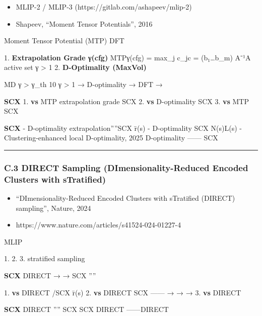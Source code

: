\documentclass[
  12pt,
]{article}
\providecommand{\tightlist}{%
  \setlength{\itemsep}{0pt}\setlength{\parskip}{0pt}}
\begin{document}
\begin{itemize}
\tightlist
\item
  \textbf{}MLIP-2 / MLIP-3 (https://gitlab.com/ashapeev/mlip-2)
\item
  \textbf{}Shapeev, ``Moment Tensor Potentials'', 2016
\end{itemize}

\textbf{} Moment Tensor Potential (MTP) 
DFT 

\textbf{} 1. \textbf{Extrapolation Grade γ(cfg)}
MTPγ(cfg) = max\_j \textbar c\_j\textbar c = (b₁\ldots b\_m) 
A⁻¹A  active set  γ \textgreater{}
1 2. \textbf{D-Optimality
(MaxVol)}

\textbf{}MD  γ \textgreater{} γ\_th 10
γ \textgreater{} 1  → D-optimality  → DFT  → 

\textbf{ SCX } 1. \textbf{ vs }MTP 
extrapolation grade SCX
 2. \textbf{ vs }D-optimality
SCX
 3. \textbf{ vs
}MTP SCX 

\textbf{SCX } - D-optimality
extrapolation''''SCX
 r̄(s)  - D-optimality SCX
N(s)L(s) -
Clustering-enhanced local D-optimality, 2025
D-optimality ------ SCX 

\begin{center}\rule{0.5\linewidth}{0.5pt}\end{center}

\subsubsection{C.3 DIRECT Sampling (DImensionality-Reduced Encoded
Clusters with
sTratified)}\label{c.3-direct-sampling-dimensionality-reduced-encoded-clusters-with-stratified}

\begin{itemize}
\tightlist
\item
  \textbf{}``DImensionality-Reduced Encoded Clusters with
  sTratified (DIRECT) sampling'', Nature, 2024
\item
  \textbf{}https://www.nature.com/articles/s41524-024-01227-4
\end{itemize}

\textbf{}
MLIP

\textbf{} 1.  2.
 3. stratified sampling

\textbf{ SCX }DIRECT  →  →  SCX
''''

\textbf{} 1. \textbf{ vs }DIRECT
/SCX
 r̄(s)  2. \textbf{ vs }DIRECT
SCX ------ →  →  →
 3. \textbf{ vs }DIRECT 

\textbf{SCX }DIRECT ''''
SCX  SCX  DIRECT
------DIRECT 
\end{document}
